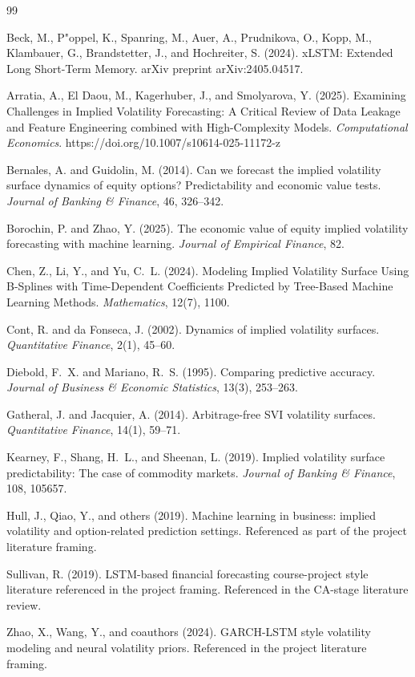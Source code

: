 \documentclass[12pt]{report}
\begin{document}
\begin{thebibliography}{99}

Beck, M., P"oppel, K., Spanring, M., Auer, A., Prudnikova, O., Kopp, M., Klambauer, G., Brandstetter, J., and Hochreiter, S. (2024).
\newblock xLSTM: Extended Long Short-Term Memory.
\newblock arXiv preprint arXiv:2405.04517.

Arratia, A., El Daou, M., Kagerhuber, J., and Smolyarova, Y. (2025).
\newblock Examining Challenges in Implied Volatility Forecasting: A Critical Review of Data Leakage and Feature Engineering combined with High-Complexity Models.
\newblock \emph{Computational Economics}. https://doi.org/10.1007/s10614-025-11172-z

Bernales, A. and Guidolin, M. (2014).
\newblock Can we forecast the implied volatility surface dynamics of equity options? Predictability and economic value tests.
\newblock \emph{Journal of Banking \& Finance}, 46, 326--342.

Borochin, P. and Zhao, Y. (2025).
\newblock The economic value of equity implied volatility forecasting with machine learning.
\newblock \emph{Journal of Empirical Finance}, 82.

Chen, Z., Li, Y., and Yu, C.~L. (2024).
\newblock Modeling Implied Volatility Surface Using B-Splines with Time-Dependent Coefficients Predicted by Tree-Based Machine Learning Methods.
\newblock \emph{Mathematics}, 12(7), 1100.

Cont, R. and da Fonseca, J. (2002).
\newblock Dynamics of implied volatility surfaces.
\newblock \emph{Quantitative Finance}, 2(1), 45--60.

Diebold, F.~X. and Mariano, R.~S. (1995).
\newblock Comparing predictive accuracy.
\newblock \emph{Journal of Business \& Economic Statistics}, 13(3), 253--263.

Gatheral, J. and Jacquier, A. (2014).
\newblock Arbitrage-free SVI volatility surfaces.
\newblock \emph{Quantitative Finance}, 14(1), 59--71.

Kearney, F., Shang, H.~L., and Sheenan, L. (2019).
\newblock Implied volatility surface predictability: The case of commodity markets.
\newblock \emph{Journal of Banking \& Finance}, 108, 105657.

Hull, J., Qiao, Y., and others (2019).
\newblock Machine learning in business: implied volatility and option-related prediction settings.
\newblock Referenced as part of the project literature framing.

Sullivan, R. (2019).
\newblock LSTM-based financial forecasting course-project style literature referenced in the project framing.
\newblock Referenced in the CA-stage literature review.

Zhao, X., Wang, Y., and coauthors (2024).
\newblock GARCH-LSTM style volatility modeling and neural volatility priors.
\newblock Referenced in the project literature framing.

\end{thebibliography}
\end{document}
